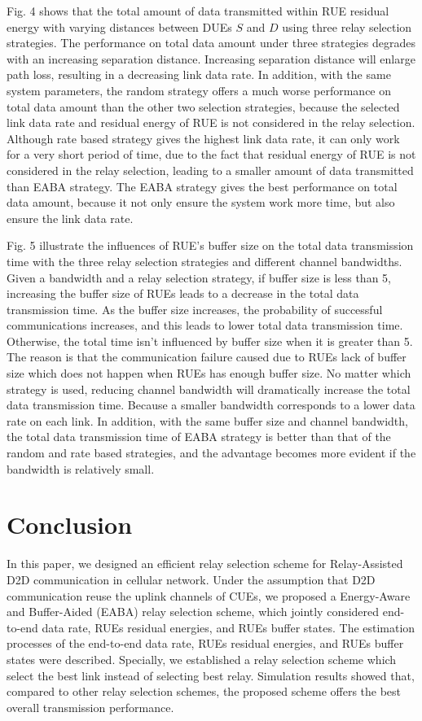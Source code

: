 \documentclass[conference]{IEEEtran}
\begin{document}
Fig. 4 shows that the total amount of data transmitted within RUE residual energy with varying distances between DUEs $S$ and $D$ using three relay selection strategies. The performance on total data amount under three strategies degrades with an increasing separation distance. Increasing separation distance will enlarge path loss, resulting in a decreasing link data rate. In addition, with the same system parameters, the random strategy offers a much worse performance on total data amount than the other two selection strategies, because the selected link data rate and residual energy of RUE is not considered in the relay selection. Although rate based strategy gives the highest link data rate, it can only work for a very short period of time, due to the fact that residual energy of RUE is not considered in the relay selection, leading to a smaller amount of data transmitted than EABA strategy. The EABA strategy gives the best performance on total data amount, because it not only ensure the system work more time, but also ensure the link data rate.

Fig. 5 illustrate the influences of RUE's buffer size on the total data transmission time with the three relay selection strategies and different channel bandwidths. Given a bandwidth and a relay selection strategy, if buffer size is less than 5, increasing the buffer size of RUEs leads to a decrease in the total data transmission time. As the buffer size increases, the probability of successful communications increases, and this leads to lower total data transmission time. Otherwise, the total time isn't influenced by buffer size when it is greater than 5. The reason is that the communication failure caused due to RUEs lack of buffer size which does not happen when RUEs has enough buffer size. No matter which strategy is used, reducing channel bandwidth will dramatically increase the total data transmission time. Because a smaller bandwidth corresponds to a lower data rate on each link. In addition, with the same buffer size and channel bandwidth, the total data transmission time of EABA strategy is better than that of the random and rate based strategies, and the advantage becomes more evident if the bandwidth is relatively small.

\section{Conclusion}
In this paper, we designed an efficient relay selection scheme for Relay-Assisted D2D communication in cellular network. Under the assumption that D2D communication reuse the uplink channels of CUEs, we proposed a Energy-Aware and Buffer-Aided (EABA) relay selection scheme, which jointly considered end-to-end data rate, RUEs residual energies, and RUEs buffer states. The estimation processes of the end-to-end data rate, RUEs residual energies, and RUEs buffer states were described. Specially, we established a relay selection scheme which select the best link instead of selecting best relay. Simulation results showed that, compared to other relay selection schemes, the proposed scheme offers the best overall transmission performance.
\end{document}
